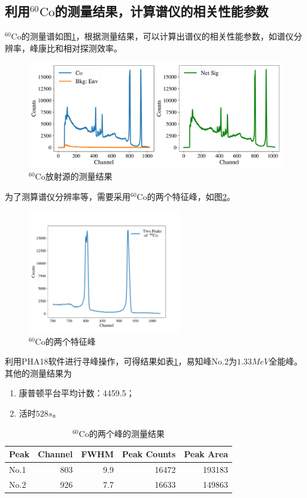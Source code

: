 \documentclass{article}
\begin{document}
\subsection{利用$^{60}\text{Co}$的测量结果，计算谱仪的相关性能参数}
$^{60}\text{Co}$的测量谱如图\ref{fig:60Co}，根据测量结果，可以计算出谱仪的相关性能参数，如谱仪分辨率，峰康比和相对探测效率。
\begin{figure}[htbp]
    \centering
    \includegraphics[width=\textwidth]{../plots/Co_net.pdf}
    \caption{$^{60}\text{Co}$放射源的测量结果\label{fig:60Co}}
\end{figure}
为了测算谱仪分辨率等，需要采用$^{60}\text{Co}$的两个特征峰，如图\ref{fig:60Co2Peak}。
\begin{figure}
    \centering
    \includegraphics[width=0.6\textwidth]{../plots/Co_two_Peak.pdf}
    \caption{$^{60}\text{Co}$的两个特征峰\label{fig:60Co2Peak}}
\end{figure}
利用PHA18软件进行寻峰操作，可得结果如表\ref{tab:60Co}，易知峰No.2为$1.33\si{MeV}$全能峰。其他的测量结果为
\begin{enumerate}
    \item 康普顿平台平均计数：4459.5；
    \item 活时$\si{528 s}$。
\end{enumerate}
\begin{table}[htbp]
    \centering
    \caption{$^{60}\text{Co}$的两个峰的测量结果\label{tab:60Co}}
    \begin{tabular}{lrrrr}
\toprule
Peak &  Channel &  FWHM &  Peak Counts &  Peak Area \\
\midrule
No.1    &      803 &   9.9 &        16472 &     193183 \\
No.2    &      926 &   7.7 &        16633 &     149863 \\
\bottomrule
\end{tabular}
\end{table}
\end{document}
